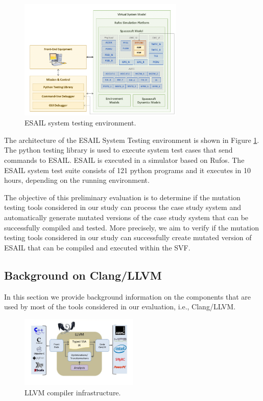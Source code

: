 \begin{figure}[h]
	\centering
    \includegraphics[width=0.7\textwidth]{images/esail}
    \caption{ESAIL system testing environment.}
    \label{fig:esail}
\end{figure}

The architecture of the ESAIL System Testing environment is shown in Figure \ref{fig:esail}. The python testing library is used to execute system test cases that send commands to ESAIL. ESAIL is executed in a simulator based on Rufos. The ESAIL system test suite consists of 121 python programs and it executes in 10 hours, depending on the running environment.

The objective of this preliminary evaluation is to determine if the mutation testing tools considered in our study can process the case study system and automatically generate mutated versions of the case study system that can be successfully compiled and tested. More precisely, we aim to verify if the mutation testing tools considered in our study can successfully create mutated version of ESAIL that can be compiled and executed within the SVF.

\subsection{Background on Clang/LLVM}
\label{subsec:background}

In this section we provide background information on the components that are used by most of the tools considered in our evaluation, i.e., Clang/LLVM.


\begin{figure}[h]
	\centering
    \includegraphics[width=0.5\textwidth]{images/llvm}
    \caption{LLVM compiler infrastructure.}
    \label{fig:llvm}
\end{figure}

